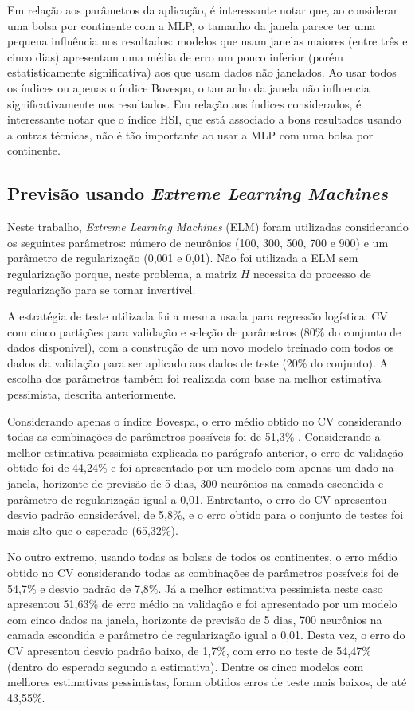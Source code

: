 \documentclass[12pt,a4paper,utf8]{ppgsi}
\begin{document}
            Em relação aos parâmetros da aplicação, é interessante notar que, ao considerar uma bolsa por continente com a MLP, o tamanho da janela parece ter uma pequena influência nos resultados: modelos que usam janelas maiores (entre três e cinco dias) apresentam uma média de erro um pouco inferior (porém estatisticamente significativa) aos que usam dados não janelados. Ao usar todos os índices ou apenas o índice Bovespa, o tamanho da janela não influencia significativamente nos resultados. Em relação aos índices considerados, é interessante notar que o índice HSI, que está associado a bons resultados usando a outras técnicas, não é tão importante ao usar a MLP com uma bolsa por continente.

        \subsection{Previsão usando \textit{Extreme Learning Machines}}

        Neste trabalho, \textit{Extreme Learning Machines} (ELM) foram utilizadas considerando os seguintes parâmetros: número de neurônios (100, 300, 500, 700 e 900) e um parâmetro de regularização (0,001 e 0,01). Não foi utilizada a ELM sem regularização porque, neste problema, a matriz $H$ necessita do processo de regularização para se tornar invertível.

        A estratégia de teste utilizada foi a mesma usada para regressão logística: CV com cinco partições para validação e seleção de parâmetros (80\% do conjunto de dados disponível), com a construção de um novo modelo treinado com todos os dados da validação para ser aplicado aos dados de teste (20\% do conjunto). A escolha dos parâmetros também foi realizada com base na melhor estimativa pessimista, descrita anteriormente.

        Considerando apenas o índice Bovespa, o erro médio obtido no CV considerando todas as combinações de parâmetros possíveis foi de 51,3\% . Considerando a melhor estimativa pessimista explicada no parágrafo anterior, o erro de validação obtido foi de 44,24\% e foi apresentado por um modelo com apenas um dado na janela, horizonte de previsão de 5 dias, 300 neurônios na camada escondida e parâmetro de regularização igual a 0,01. Entretanto, o erro do CV apresentou desvio padrão considerável, de 5,8\%, e o erro obtido para o conjunto de testes foi mais alto que o esperado (65,32\%).

        No outro extremo, usando todas as bolsas de todos os continentes, o erro médio obtido no CV considerando todas as combinações de parâmetros possíveis foi de 54,7\% e desvio padrão de 7,8\%. Já a melhor estimativa pessimista neste caso apresentou 51,63\% de erro médio na validação e foi apresentado por um modelo com cinco dados na janela, horizonte de previsão de 5 dias, 700 neurônios na camada escondida e parâmetro de regularização igual a 0,01. Desta vez, o erro do CV apresentou desvio padrão baixo, de 1,7\%, com erro no teste de 54,47\% (dentro do esperado segundo a estimativa). Dentre os cinco modelos com melhores estimativas pessimistas, foram obtidos erros de teste mais baixos, de até 43,55\%.
\end{document}
